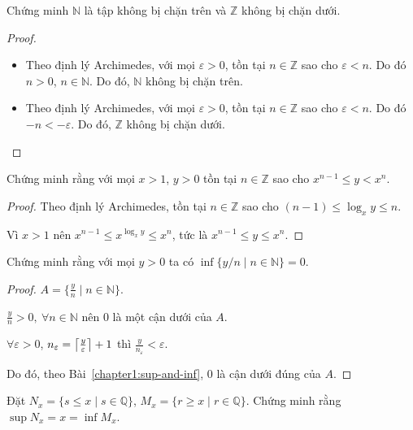 \documentclass[class=analysis,crop=false]{standalone}
\begin{document}
\begin{exercise}
    Chứng minh $\mathbb{N}$ là tập không bị chặn trên và $\mathbb{Z}$ không bị chặn dưới.
\end{exercise}

\begin{proof}
    \begin{itemize}
        \item Theo định lý Archimedes, với mọi $\varepsilon > 0$, tồn tại $n\in\mathbb{Z}$ sao cho $\varepsilon < n$. Do đó $n > 0$, $n\in\mathbb{N}$. Do đó, $\mathbb{N}$ không bị chặn trên.
        \item Theo định lý Archimedes, với mọi $\varepsilon > 0$, tồn tại $n\in\mathbb{Z}$ sao cho $\varepsilon < n$. Do đó $-n < -\varepsilon$. Do đó, $\mathbb{Z}$ không bị chặn dưới.
    \end{itemize}
\end{proof}

\begin{exercise}
    Chứng minh rằng với mọi $x > 1$, $y > 0$ tồn tại $n\in\mathbb{Z}$ sao cho $x^{n-1}\le y < x^{n}$.
\end{exercise}

\begin{proof}
    Theo định lý Archimedes, tồn tại $n\in\mathbb{Z}$ sao cho $(n-1)\le\log_{x}y\le n$.
    \par Vì $x > 1$ nên $x^{n-1} \le x^{\log_{x}y} \le x^{n}$, tức là $x^{n-1}\le y\le x^{n}$.
\end{proof}

\begin{exercise}
    Chứng minh rằng với mọi $y > 0$ ta có $\inf\{ y/n\mid n\in\mathbb{N} \} = 0$.
\end{exercise}

\begin{proof}
    $A = \{ \frac{y}{n}\mid n\in\mathbb{N} \}$.
    \par $\frac{y}{n} > 0,\ \forall n\in\mathbb{N}$ nên $0$ là một cận dưới của $A$.
    \par $\forall\varepsilon > 0$, $n_{\varepsilon} = \left\lceil{\frac{y}{\varepsilon}}\right\rceil + 1$ thì $\frac{y}{n_{\varepsilon}} < \varepsilon$.
    \par Do đó, theo Bài~\ref{chapter1:sup-and-inf}, $0$ là cận dưới đúng của $A$.
\end{proof}

\begin{exercise}
    Đặt $N_{x} = \{ s\le x\mid s\in\mathbb{Q} \}$, $M_{x} = \{ r\ge x\mid r\in\mathbb{Q} \}$. Chứng minh rằng $\sup N_{x} = x = \inf M_{x}$.
\end{exercise}
\end{document}
